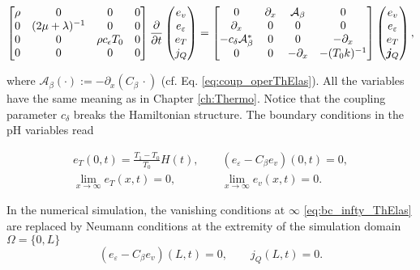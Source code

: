 \begin{equation}\label{eq:pHsys_ThElas1D}
\begin{bmatrix}
{\rho} & {0} & {0} & {0}\\
{0} & (2\mu + \lambda)^{-1} & {0} & {0}\\
0 & 0 & \rho c_\epsilon T_0 & 0\\
{0} & {0} & {0} & {0}\\
\end{bmatrix}
\diffp{}{t}
\begin{pmatrix}
{e}_v \\
{e}_\varepsilon \\
{e}_T \\
{j}_Q \\
\end{pmatrix} = 
\begin{bmatrix}
{0} & \partial_x & \mathcal{A}_\beta & {0}\\
\partial_x & {0} & {0} & {0} \\
- c_\delta \mathcal{A}_\beta^* & 0 & 0 & -\partial_x \\
{0} & {0} & -\partial_x & - (T_0 k)^{-1} \\
\end{bmatrix}
\begin{pmatrix}
{e}_v \\
{e}_\varepsilon \\
{e}_T \\
\bm{j}_Q \\
\end{pmatrix},
\end{equation}

where $\mathcal{A}_\beta(\cdot):=-\partial_x({C}_\beta \, \cdot)$ (cf. Eq. \eqref{eq:coup_operThElas}). All the variables have the same meaning as in Chapter \ref{ch:Thermo}. Notice that the coupling parameter $c_\delta$ breaks the Hamiltonian structure. The boundary conditions in the pH variables read

\begin{align}
e_T(0, t) = \frac{T_1 - T_0}{T_0} H(t), \qquad (e_\varepsilon - {C}_\beta e_v)(0, t) = 0, \\
\lim_{x \rightarrow \infty} e_T(x, t) = 0, \qquad \qquad \lim_{x \rightarrow \infty} e_v(x, t) = 0. \label{eq:bc_infty_ThElas}
\end{align}

\begin{remark}
In the numerical simulation, the vanishing conditions at $\infty$ \eqref{eq:bc_infty_ThElas} are replaced by Neumann conditions at the extremity of the simulation domain $\Omega = \{0, L\}$ \cite{rabizadeh2016}
\begin{equation}\label{eq:bc_sim_TherElas}
(e_\varepsilon - {C}_\beta e_v)(L, t) = 0, \qquad j_Q(L, t) = 0.
\end{equation}
\end{remark}


